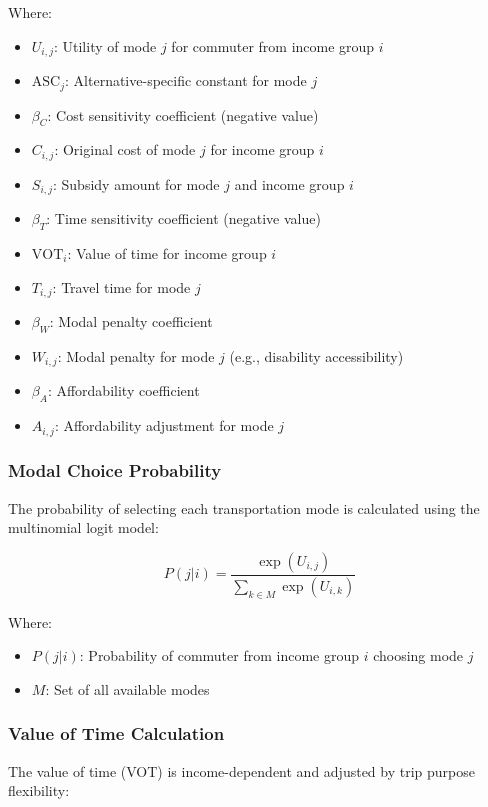 Where:
\begin{itemize}
    \item $U_{i,j}$: Utility of mode $j$ for commuter from income group $i$
    \item $\text{ASC}_j$: Alternative-specific constant for mode $j$
    \item $\beta_C$: Cost sensitivity coefficient (negative value)
    \item $C_{i,j}$: Original cost of mode $j$ for income group $i$
    \item $S_{i,j}$: Subsidy amount for mode $j$ and income group $i$
    \item $\beta_T$: Time sensitivity coefficient (negative value)
    \item $\text{VOT}_i$: Value of time for income group $i$
    \item $T_{i,j}$: Travel time for mode $j$
    \item $\beta_W$: Modal penalty coefficient
    \item $W_{i,j}$: Modal penalty for mode $j$ (e.g., disability accessibility)
    \item $\beta_A$: Affordability coefficient
    \item $A_{i,j}$: Affordability adjustment for mode $j$
\end{itemize}

\subsubsection{Modal Choice Probability}
The probability of selecting each transportation mode is calculated using the multinomial logit model:

\begin{equation}
P(j|i) = \frac{\exp(U_{i,j})}{\sum_{k \in M} \exp(U_{i,k})}
\end{equation}

Where:
\begin{itemize}
    \item $P(j|i)$: Probability of commuter from income group $i$ choosing mode $j$
    \item $M$: Set of all available modes
\end{itemize}

\subsubsection{Value of Time Calculation}
The value of time (VOT) is income-dependent and adjusted by trip purpose flexibility:


